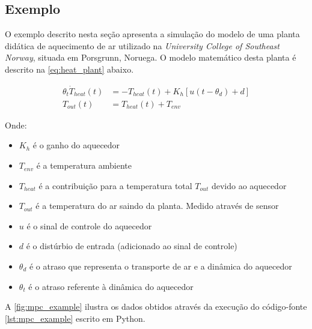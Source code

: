 
\subsection{Exemplo}
\label{subsec:mpc_example}

O exemplo descrito nesta seção apresenta a simulação do modelo de uma planta didática de aquecimento de ar
utilizado na \textit{University College of Southeast Norway}, situada em Porsgrunn, Noruega. O modelo matemático
desta planta é descrito na \cref{eq:heat_plant} abaixo.

\begin{subequations}
    \label{eq:heat_plant}
    \begin{align}
        {\theta}_t \dot{T}_{heat} (t) &= -T_{heat} (t) + K_h [u(t - {\theta}_d) + d]     \\
        T_{out} (t) &= T_{heat} (t) + T_{env}
    \end{align}
\end{subequations}

\noindent
Onde: 
\begin{itemize}
	\item $K_h$ é o ganho do aquecedor
	\item $T_{env}$ é a temperatura ambiente
	\item $T_{heat}$ é a contribuição para a temperatura total $T_{out}$ devido ao aquecedor
	\item $T_{out}$ é a temperatura do ar saindo da planta. Medido através de sensor
	\item $u$ é o sinal de controle do aquecedor
	\item $d$ é o distúrbio de entrada (adicionado ao sinal de controle)
	\item ${\theta}_d$ é o atraso que representa o transporte de ar e a dinâmica do aquecedor
	\item ${\theta}_t$ é o atraso referente à dinâmica do aquecedor
\end{itemize}

A \cref{fig:mpc_example} ilustra os dados obtidos através da execução do código-fonte \ref{lst:mpc_example}
escrito em Python.


